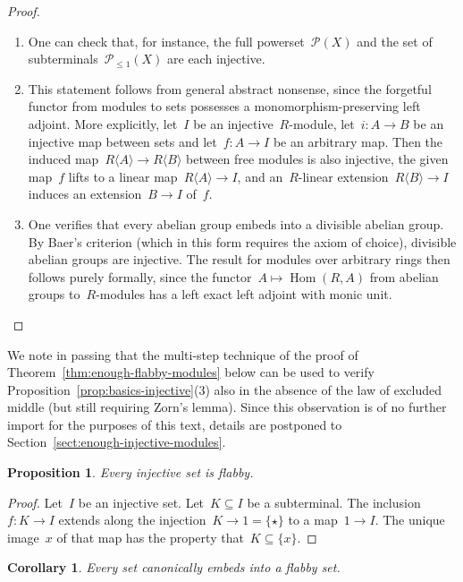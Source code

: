 \documentclass[oneside]{amsart}
\theoremstyle{definition}
\theoremstyle{plain}
\newtheorem{prop}[defn]{Proposition}
\newtheorem{cor}[defn]{Corollary}
\theoremstyle{remark}
\renewcommand{\P}{\mathcal{P}}
\DeclareMathOperator{\Hom}{Hom}
\renewcommand{\_}{\mathpunct{.}\,}
\begin{document}
\begin{proof}\begin{enumerate}
\item One can check that, for instance, the full powerset~$\P(X)$ and the set of
subterminals~$\P_{\leq 1}(X)$ are each injective.
\item This statement follows from general abstract nonsense, since the forgetful functor from modules to sets possesses a monomorphism-preserving left
adjoint. More explicitly, let~$I$ be an injective~$R$-module, let~$i : A \to B$ be an injective map between sets and
let~$f : A \to I$ be an arbitrary map. Then the induced map~$R\langle A \rangle
\to R\langle B \rangle$ between free modules is also injective, the given
map~$f$ lifts to a linear map~$R\langle A \rangle \to I$, and an~$R$-linear
extension~$R\langle B \rangle \to I$ induces an extension~$B \to I$ of~$f$.
\item One verifies that every abelian group embeds into a divisible
abelian group. By Baer's criterion (which in this form requires the axiom of choice), divisible abelian groups are injective.
The result for modules over arbitrary rings then follows purely
formally, since the functor~$A \mapsto \Hom(R,A)$ from abelian groups
to~$R$-modules has a left exact left adjoint with monic unit. \qedhere
\end{enumerate}\end{proof}

We note in passing that the multi-step technique of the proof of
Theorem~\ref{thm:enough-flabby-modules} below can be used to verify
Proposition~\ref{prop:basics-injective}(3) also in the absence of the law of
excluded middle (but still requiring Zorn's lemma). Since this observation is of no
further import for the purposes of this text, details are postponed to
Section~\ref{sect:enough-injective-modules}.

\begin{prop}\label{prop:injective-flabby}
Every injective set is flabby.\end{prop}

\begin{proof}Let~$I$ be an injective set. Let~$K \subseteq I$ be a subterminal.
The inclusion~$f : K \to I$ extends along the injection~$K \to 1 = \{\star\}$
to a map~$1 \to I$. The unique image~$x$ of that map has the property that~$K
\subseteq \{x\}$.\end{proof}

\begin{cor}\label{cor:enough-flabby-sets}
Every set canonically embeds into a flabby set.\end{cor}
\end{document}

